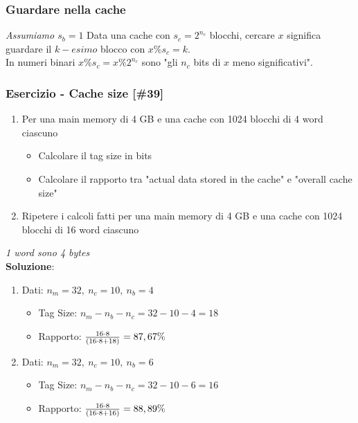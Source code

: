 \documentclass[12pt,a4paper]{article}
\begin{document}
\subsubsection{Guardare nella cache}
\textsl{Assumiamo $s_b = 1$}
Data una cache con  $s_c = 2^{n_c}$ blocchi, cercare $x$ significa guardare il $k-esimo$ blocco con $x \% s_c = k$.\\
In numeri binari $x \% s_c = x \% 2^{n_c}$ sono "gli $n_c$ bits di $x$ meno significativi".\\

\subsubsection{Esercizio - Cache size [\#39]}
\begin{enumerate}
\item Per una main memory di 4 GB e una cache con 1024 blocchi di 4 word ciascuno
\begin{itemize}
\item Calcolare il tag size in bits
\item Calcolare il rapporto tra "actual data stored in the cache" e "overall cache size"
\end{itemize}
\item Ripetere i calcoli fatti per una main memory di 4 GB e una cache con 1024 blocchi di 16 word ciascuno
\end{enumerate}
\textsl{1 word sono 4 bytes}\\
\textbf{Soluzione}:
\begin{enumerate}
\item Dati: $n_m = 32,\ n_c = 10,\ n_b = 4$
\begin{itemize}
\item Tag Size: $n_m - n_b - n_c = 32-10-4 = 18$
\item Rapporto: ${16 \cdot 8 \over (16 \cdot 8 + 18)} = 87,67\%$
\end{itemize}
\item Dati: $n_m = 32,\ n_c = 10,\ n_b = 6$
\begin{itemize}
\item Tag Size: $n_m - n_b - n_c = 32-10-6 = 16$
\item Rapporto: ${16 \cdot 8 \over (16 \cdot 8 + 16)} = 88,89\%$
\end{itemize}
\end{enumerate}
\end{document}
